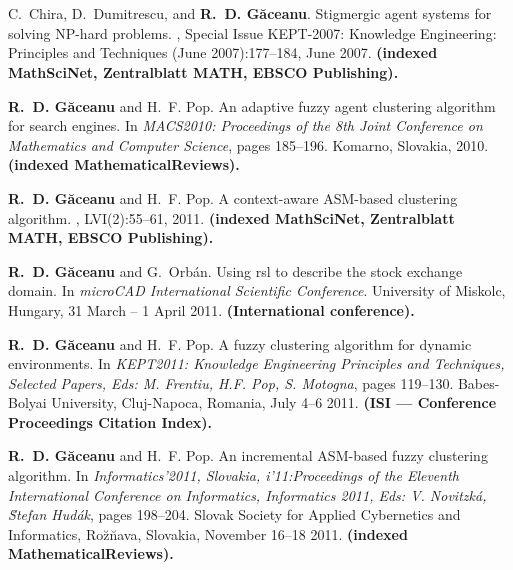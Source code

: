 \chapter*{}
\thispagestyle{empty}
\addtocounter{page}{-1}

\renewcommand\bibname{List of publications}

\begin{thebibliography}{CDG07}

C.~Chira, D.~Dumitrescu, and \textbf{R.~D. G\u{a}ceanu}.
\newblock Stigmergic agent systems for solving {NP}-hard problems.
, Special Issue KEPT-2007: Knowledge
  Engineering: Principles and Techniques (June 2007):177--184, June 2007.
\newblock \textbf{(indexed MathSciNet, Zentralblatt MATH, EBSCO Publishing).}

  

\textbf{R.~D. G{\u{a}}ceanu} and H.~F. Pop.
\newblock An adaptive fuzzy agent clustering algorithm for search engines.
\newblock In {\em MACS2010: Proceedings of the 8th Joint Conference on
  Mathematics and Computer Science}, pages 185--196. Komarno, Slovakia, 2010.
\newblock \textbf{(indexed MathematicalReviews).}

\textbf{R.~D. G{\u{a}}ceanu} and H.~F. Pop.
\newblock A context-aware {ASM}-based clustering algorithm.
,
  LVI(2):55--61, 2011.
\newblock \textbf{(indexed MathSciNet, Zentralblatt MATH, EBSCO Publishing).}
  
\textbf{R.~D. G{\u{a}}ceanu} and G.~Orb{\'{a}}n.
\newblock Using rsl to describe the stock exchange domain.
\newblock In {\em microCAD International Scientific Conference}. University of
  Miskolc, Hungary, 31 March -- 1 April 2011.
\newblock \textbf{(International conference).}

\textbf{R.~D. G{\u{a}}ceanu} and H.~F. Pop.
\newblock A fuzzy clustering algorithm for dynamic environments.
\newblock In {\em KEPT2011: Knowledge Engineering Principles and Techniques,
  Selected Papers, Eds: M. Frentiu, H.F. Pop, S. Motogna}, pages 119--130.
  Babes-Bolyai University, Cluj-Napoca, Romania, July 4--6 2011.
\newblock \textbf{(ISI --- Conference Proceedings Citation Index).}

\textbf{R.~D. G{\u{a}}ceanu} and H.~F. Pop.
\newblock An incremental {ASM}-based fuzzy clustering algorithm.
\newblock In {\em Informatics'2011, Slovakia, i'11:Proceedings of the Eleventh
  International Conference on Informatics, Informatics 2011, Eds: V.
  Novitzk{\'{a}}, {\u{S}}tefan Hud{\'{a}}k}, pages 198--204. Slovak Society for
  Applied Cybernetics and Informatics, Ro{\u{z}}{\u{n}}ava, Slovakia, November
  16--18 2011.  
\newblock \textbf{(indexed MathematicalReviews).}
  

\end{thebibliography}
